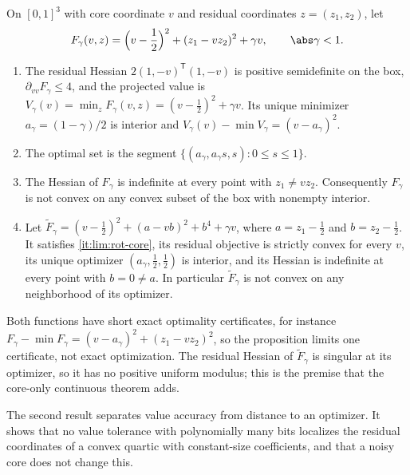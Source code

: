 \begin{proposition}\label{prop:lim:rotating}
On $[0,1]^3$ with core coordinate $v$ and residual coordinates
$z=(z_1,z_2)$, let
\[
 F_\gamma(v,z)=\Bigl(v-\frac12\Bigr)^2+(z_1-vz_2)^2+\gamma v,\qquad
 \abs\gamma<1 .
\]
\begin{enumerate}[label=(\alph*)]
\item\label{it:lim:rot-core} The residual Hessian
$2(1,-v)^{\mathsf T}(1,-v)$ is positive semidefinite on the box,
$\partial_{vv}F_\gamma\le4$, and the projected value is
$V_\gamma(v)=\min_zF_\gamma(v,z)=(v-\frac12)^2+\gamma v$. Its unique
minimizer $a_\gamma=(1-\gamma)/2$ is interior and
$V_\gamma(v)-\min V_\gamma=(v-a_\gamma)^2$.
\item\label{it:lim:rot-fiber} The optimal set is the segment
$\{(a_\gamma,a_\gamma s,s):0\le s\le1\}$.
\item\label{it:lim:rot-indef} The Hessian of $F_\gamma$ is indefinite at
every point with $z_1\ne vz_2$. Consequently $F_\gamma$ is not convex on any
convex subset of the box with nonempty interior.
\item\label{it:lim:rot-strict} Let
$\widetilde F_\gamma=(v-\frac12)^2+(a-vb)^2+b^4+\gamma v$, where
$a=z_1-\frac12$ and $b=z_2-\frac12$. It satisfies \ref{it:lim:rot-core}, its
residual objective is strictly convex for every $v$, its unique optimizer
$(a_\gamma,\frac12,\frac12)$ is interior, and its Hessian is indefinite at
every point with $b=0\ne a$. In particular $\widetilde F_\gamma$ is not
convex on any neighborhood of its optimizer.
\end{enumerate}
\end{proposition}

Both functions have short exact optimality certificates, for instance
$F_\gamma-\min F_\gamma=(v-a_\gamma)^2+(z_1-vz_2)^2$, so the proposition
limits one certificate, not exact optimization. The residual Hessian of
$\widetilde F_\gamma$ is singular at its optimizer, so it has no positive
uniform modulus; this is the premise that the core-only continuous theorem
adds.

The second result separates value accuracy from distance to an optimizer.
It shows that no value tolerance with polynomially many bits localizes
the residual coordinates of a convex quartic with constant-size
coefficients, and that a noisy core does not change this.

